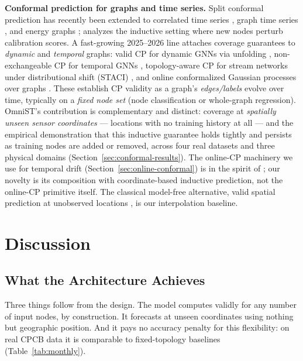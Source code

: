 \documentclass[journal]{IEEEtran}
\begin{document}
\textbf{Conformal prediction for graphs and time series.} Split conformal prediction \cite{vovk2005algorithmic,angelopoulos2023conformal} has recently been extended to correlated time series \cite{corel2025}, graph time series \cite{conformalgraphts2026}, and energy graphs \cite{incontextresidual2026}; \cite{conformalinductivegnn2024} analyzes the inductive setting where new nodes perturb calibration scores. A fast-growing 2025--2026 line attaches coverage guarantees to \emph{dynamic} and \emph{temporal} graphs: valid CP for dynamic GNNs via unfolding \cite{validcpdyngnn2024}, non-exchangeable CP for temporal GNNs \cite{nonexchcptgnn2025}, topology-aware CP for stream networks under distributional shift (STACI) \cite{staci2025}, and online conformalized Gaussian processes over graphs \cite{conformalgp_online2025}. These establish CP validity as a graph's \emph{edges/labels} evolve over time, typically on a \emph{fixed node set} (node classification or whole-graph regression). OmniST's contribution is complementary and distinct: coverage at \emph{spatially unseen sensor coordinates} --- locations with no training history at all --- and the empirical demonstration that this inductive guarantee holds tightly and persists as training nodes are added or removed, across four real datasets and three physical domains (Section~\ref{sec:conformal-results}). The online-CP machinery we use for temporal drift (Section~\ref{sec:online-conformal}) is in the spirit of \cite{conformalgp_online2025,staci2025}; our novelty is its composition with coordinate-based inductive prediction, not the online-CP primitive itself. The classical model-free alternative, valid spatial prediction at unobserved locations \cite{validspatial2020}, is our interpolation baseline.

\section{Discussion}
\label{sec:discussion}

\subsection{What the Architecture Achieves}

Three things follow from the design. The model computes validly for any number of input nodes, by
construction. It forecasts at unseen coordinates using nothing but geographic position. And it pays no
accuracy penalty for this flexibility: on real CPCB data it is comparable to fixed-topology baselines
(Table~\ref{tab:monthly}).
\end{document}
